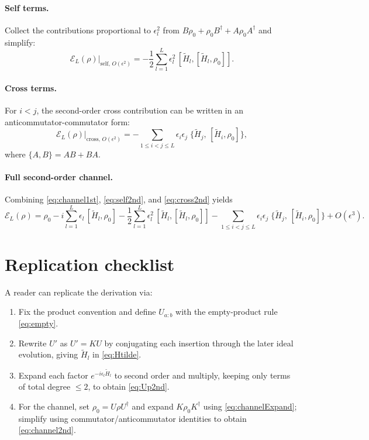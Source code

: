 \documentclass[11pt]{article}
\newcommand{\cE}{\mathcal{E}}
\begin{document}
\paragraph{Self terms.}
Collect the contributions proportional to $\epsilon_l^2$ from $B\rho_0+\rho_0B^\dagger + A\rho_0A^\dagger$ and simplify:
\begin{equation}
\boxed{
\cE_L(\rho)\Big|_{\text{self},\,O(\epsilon^2)}
= -\frac12\sum_{l=1}^{L}\epsilon_l^2 \,[\widetilde H_l,[\widetilde H_l,\rho_0]].
}
\label{eq:self2nd}
\end{equation}

\paragraph{Cross terms.}
For $i<j$, the second-order cross contribution can be written in an anticommutator-commutator form:
\begin{equation}
\boxed{
\cE_L(\rho)\Big|_{\text{cross},\,O(\epsilon^2)}
= -\sum_{1\le i<j\le L}\epsilon_i\epsilon_j\;\{\widetilde H_j,\,[\widetilde H_i,\rho_0]\},
}
\label{eq:cross2nd}
\end{equation}
where $\{A,B\}=AB+BA$.

\paragraph{Full second-order channel.}
Combining \eqref{eq:channel1st}, \eqref{eq:self2nd}, and \eqref{eq:cross2nd} yields
\begin{equation}
\boxed{
\cE_L(\rho)
= \rho_0
- i\sum_{l=1}^{L}\epsilon_l\,[\widetilde H_l,\rho_0]
-\frac12\sum_{l=1}^{L}\epsilon_l^2 \,[\widetilde H_l,[\widetilde H_l,\rho_0]]
-\sum_{1\le i<j\le L}\epsilon_i\epsilon_j\;\{\widetilde H_j,\,[\widetilde H_i,\rho_0]\}
+ O(\epsilon^3).
}
\label{eq:channel2nd}
\end{equation}

\section{Replication checklist}

A reader can replicate the derivation via:
\begin{enumerate}
\item Fix the product convention and define $U_{a:b}$ with the empty-product rule \eqref{eq:empty}.
\item Rewrite $U'$ as $U'=KU$ by conjugating each insertion through the later ideal evolution, giving $\widetilde H_l$ in \eqref{eq:Htilde}.
\item Expand each factor $e^{-i\epsilon_l\widetilde H_l}$ to second order and multiply, keeping only terms of total degree $\le 2$, to obtain \eqref{eq:Up2nd}.
\item For the channel, set $\rho_0=U\rho U^\dagger$ and expand $K\rho_0K^\dagger$ using \eqref{eq:channelExpand}; simplify using commutator/anticommutator identities to obtain \eqref{eq:channel2nd}.
\end{enumerate}
\end{document}
